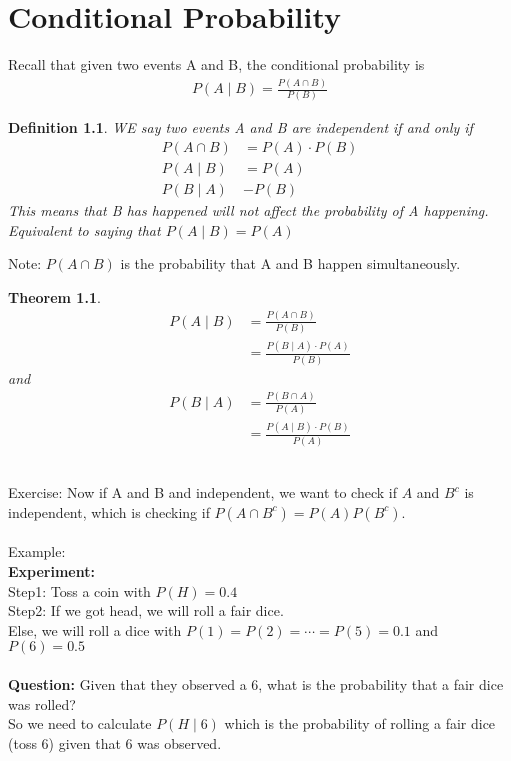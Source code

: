 \documentclass[11pt,oneside]{book}
\theoremstyle{break}
\theoremstyle{break}
\newtheorem{thm}{Theorem}[section]
\newtheorem{defn}{Definition}[corL]
\newcommand{\note}{\color{red}Note: \color{black}}
\newcommand{\example}{\color{green}Example: \color{black}}
\newcommand{\exercise}{\color{green}Exercise: \color{black}}
\begin{document}
\chapter[Conditional Probability]{Conditional Probability}
Recall that given two events A and B, the conditional probability is \begin{align*}
P(A\mid B)=\frac{P(A\cap B)}{P(B)}
\end{align*}
\begin{defn}
WE say two events A and B are independent if and only if\begin{align*}
P(A\cap B)&=P(A)\cdot P(B)\\
P(A\mid B)&=P(A)\\
P(B\mid A)&-P(B)
\end{align*}
This means that B has happened will not affect the probability of A happening. Equivalent to saying that $P(A\mid B)=P(A)$
\end{defn}
\note $P(A\cap B)$ is the probability that A and B happen simultaneously.\\
\begin{thm}
\begin{align*}
P(A\mid B)&=\frac{P(A\cap B)}{P(B)}\\
&=\frac{P(B\mid A)\cdot P(A)}{P(B)}
\end{align*}
and \begin{align*}
P(B\mid A)&=\frac{P(B\cap A)}{P(A)}\\
&=\frac{P(A\mid B)\cdot P(B)}{P(A)}
\end{align*}
\end{thm}
\hfill\\
\exercise Now if A and B and independent, we want to check if $A$ and $B^{c}$ is independent, which is checking if $P(A\cap B^c)=P(A)P(B^c)$. \\
\hfill\\
\example\\
\textbf{Experiment:} \\
\text{\qquad} Step1: Toss a coin with $P(H)=0.4$\\
\text{\qquad} Step2: If we got head, we will roll a fair dice. \\
\text{\qquad \quad} \text{\qquad} Else, we will roll a dice with $P(1)=P(2)=\cdots=P(5)=0.1$ and $P(6)=0.5$\\
\hfill\\
\textbf{Question:} Given that they observed a 6, what is the probability that a fair dice was rolled?\\
So we need to calculate $P(H\mid 6)$ which is the probability of rolling a fair dice (toss 6) given that 6 was observed.\\
\end{document}
